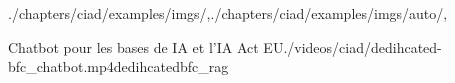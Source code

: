 \begin{graphicspathcontext}{{./chapters/ciad/examples/imgs/},{./chapters/ciad/examples/imgs/auto/},\old}

\begin{textvideoframe}{Chatbot pour les bases de IA et l'IA Act EU}{./videos/ciad/dedihcated-bfc_chatbot.mp4}{dedihcatedbfc_rag}
\end{textvideoframe}

\end{graphicspathcontext}

\endinput
